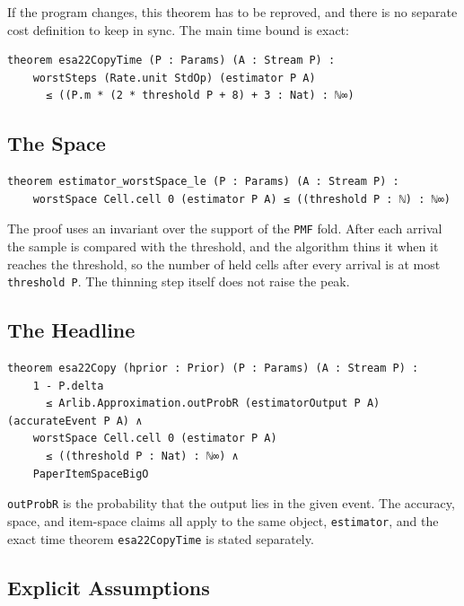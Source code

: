 \documentclass[acmsmall,nonacm]{acmart}
\begin{document}
If the program changes, this theorem has to be reproved, and there is no separate cost definition to keep in sync.
The main time bound is exact:

\begin{lstlisting}
theorem esa22CopyTime (P : Params) (A : Stream P) :
    worstSteps (Rate.unit StdOp) (estimator P A)
      ≤ ((P.m * (2 * threshold P + 8) + 3 : Nat) : ℕ∞)
\end{lstlisting}

\subsection{The Space}\label{sec:space}

\begin{lstlisting}
theorem estimator_worstSpace_le (P : Params) (A : Stream P) :
    worstSpace Cell.cell 0 (estimator P A) ≤ ((threshold P : ℕ) : ℕ∞)
\end{lstlisting}

The proof uses an invariant over the support of the \lstinline{PMF} fold.
After each arrival the sample is compared with the threshold, and the algorithm thins it when it reaches the threshold, so the number of held cells after every arrival is at most \lstinline{threshold P}.
The thinning step itself does not raise the peak.

\subsection{The Headline}\label{sec:headline}

\begin{lstlisting}
theorem esa22Copy (hprior : Prior) (P : Params) (A : Stream P) :
    1 - P.delta
      ≤ Arlib.Approximation.outProbR (estimatorOutput P A) (accurateEvent P A) ∧
    worstSpace Cell.cell 0 (estimator P A)
      ≤ ((threshold P : Nat) : ℕ∞) ∧
    PaperItemSpaceBigO
\end{lstlisting}

\lstinline{outProbR} is the probability that the output lies in the given event.
The accuracy, space, and item-space claims all apply to the same object, \lstinline{estimator}, and the exact time theorem \lstinline{esa22CopyTime} is stated separately.

\subsection{Explicit Assumptions}\label{sec:assumptions}
\end{document}
